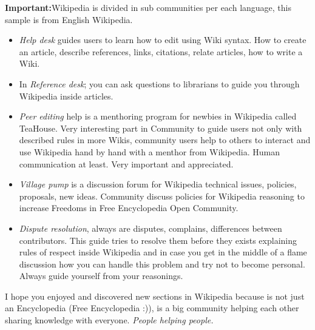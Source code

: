 \par \textbf{Important:}Wikipedia is divided in sub communities per each language, this sample is from English Wikipedia.

\begin{itemize}
	\item \textit{Help desk} guides users to learn how to edit using Wiki syntax. How to create an article, describe references, links, citations, relate articles, how to write a Wiki.
	\item In \textit{Reference desk}; you can ask questions to librarians to guide you through Wikipedia inside articles.
	\item \textit{Peer editing} help is a menthoring program for newbies in Wikipedia called TeaHouse. Very interesting part in Community to guide users not only with described rules in more Wikis, community users help to others to interact and use Wikipedia hand by hand with a menthor from Wikipedia. Human communication at least. Very important and appreciated.
	\item \textit{Village pump} is a discussion forum for Wikipedia technical issues, policies, proposals, new ideas. Community discuss policies for Wikipedia reasoning to increase Freedoms in Free Encyclopedia Open Community.
	\item \textit{Dispute resolution}, always are disputes, complains, differences between contributors. This guide tries to resolve them before they exists explaining rules of respect inside Wikipedia and in case you get in the middle of a flame discussion how you can handle this problem and try not to become personal. Always guide yourself from your reasonings.
\end{itemize} I hope you enjoyed and discovered new sections in Wikipedia because is not just an Encyclopedia (Free Encyclopedia :)), is a big community helping each other sharing knowledge with everyone. \textit{People helping people.}

